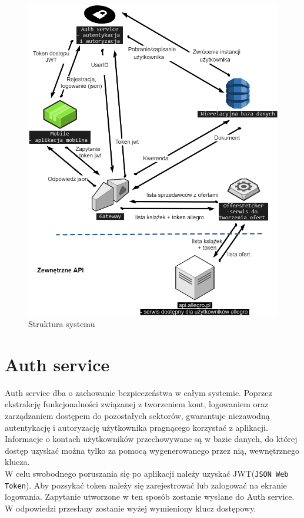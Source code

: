\begin{figure}[H]
	\centering
	\includegraphics[width=\linewidth]{architecture_overview.png}
	\caption{Struktura systemu}
\end{figure}

\section{Auth service}
Auth service dba o zachowanie bezpieczeństwa w całym systemie.
Poprzez ekstrakcję funkcjonalności związanej z tworzeniem kont, logowaniem oraz zarządzaniem dostępem do pozostałych sektorów, gwarantuje niezawodną autentykację i autoryzację użytkownika pragnącego korzystać z aplikacji.\\
Informacje o kontach użytkowników przechowywane są w bazie danych, do której dostęp uzyskać można tylko za pomocą wygenerowanego przez nią, wewnętrznego klucza. 
\\
W celu swobodnego poruszania się po aplikacji należy uzyskać JWT(\texttt{JSON Web Token}). Aby pozsykać token należy się zarejestrować lub zalogować na ekranie logowania. Zapytanie utworzone w ten sposób zostanie wysłane do Auth service. W odpowiedzi przesłany zostanie wyżej wymieniony klucz dostępowy.\\

